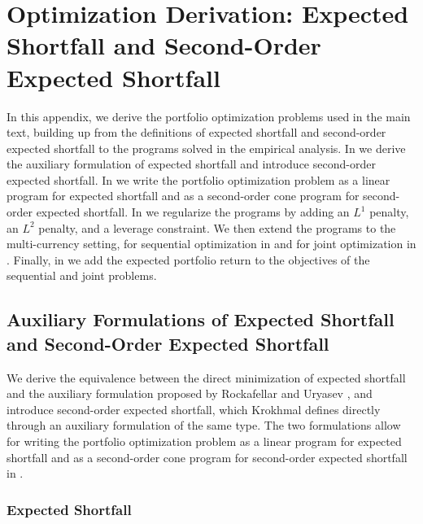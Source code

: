 \chapter{Optimization Derivation: Expected Shortfall and Second-Order Expected Shortfall} \label{app:es_derivation}

In this appendix, we derive the portfolio optimization problems used in the main text, building up from the definitions of
expected shortfall and second-order expected shortfall to the programs solved in the empirical analysis.
In  we derive the auxiliary formulation of
expected shortfall and introduce second-order expected shortfall. In  we write the portfolio optimization problem as a linear program for expected shortfall
and as a second-order cone program for second-order expected shortfall. In  we regularize the programs by adding an $L^1$
penalty, an $L^2$ penalty, and a leverage constraint. We
then extend the programs to the multi-currency setting, for sequential optimization in 
and for joint optimization in . Finally, in  we add the expected
portfolio return to the objectives of the sequential and joint problems.

\section{Auxiliary Formulations of Expected Shortfall and Second-Order Expected Shortfall} \label{app:es_auxiliary_formulation}

We derive the equivalence between the direct minimization of expected shortfall and the auxiliary formulation proposed
by Rockafellar and Uryasev \cite{RockafellarUryasev2000}, and introduce second-order expected shortfall, which Krokhmal
\cite{Krokhmal2007} defines directly through an auxiliary formulation of the same type. The two formulations
allow for writing the portfolio optimization problem as a linear program for expected shortfall and as a second-order cone
program for second-order expected shortfall in .

\subsection{Expected Shortfall} \label{app:es_auxiliary}

